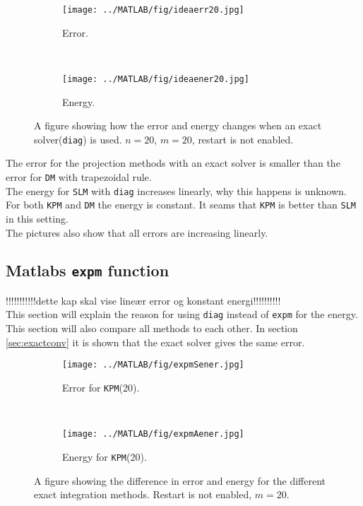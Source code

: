 \begin{figure}[H]
        \centering
        \begin{subfigure}[b]{0.45\textwidth}
                \texttt{[image: ../MATLAB/fig/ideaerr20.jpg]}
                \caption{ Error. }
                \label{fig:ideaerr20}
        \end{subfigure}%
        ~
        \begin{subfigure}[b]{0.45\textwidth}
                \texttt{[image: ../MATLAB/fig/ideaener20.jpg]}
                \caption{ Energy. }
                \label{fig:ideaener20}
        \end{subfigure}
        \caption{ A figure showing how the error and energy changes when an exact solver(\texttt{diag}) is used. $n = 20$, $m = 20$, restart is not enabled. }
        \label{fig:idea0}
\end{figure}
The error for the projection methods with an exact solver is smaller than the error for \texttt{DM} with trapezoidal rule. \\
The energy for \texttt{SLM} with \texttt{diag} increases linearly, why this happens is unknown. For both \texttt{KPM} and \texttt{DM} the energy is constant. It seams that \texttt{KPM} is better than \texttt{SLM} in this setting. \\
The pictures also show that all errors are increasing linearly.

\subsection{Matlabs \texttt{expm} function} \label{sec:resultexpm} %
!!!!!!!!!!!dette kap skal vise lineær error og konstant energi!!!!!!!!!!\\
This section will explain the reason for using \texttt{diag} instead of \texttt{expm} for the energy. This section will also compare all methods to each other. In section \ref{sec:exactconv} it is shown that the exact solver gives the same error.

\begin{figure}[H]
        \centering
		\begin{subfigure}[b]{0.45\textwidth}
                \texttt{[image: ../MATLAB/fig/expmSener.jpg]}
                \caption{ Error for \texttt{KPM}(20). }
                \label{fig:expmSerr}
        \end{subfigure}%
        ~
        \begin{subfigure}[b]{0.45\textwidth}
                \texttt{[image: ../MATLAB/fig/expmAener.jpg]}
                \caption{ Energy for \texttt{KPM}(20). }
                \label{fig:expmSener}
        \end{subfigure}
        \caption{A figure showing the difference in error and energy for the different exact integration methods. Restart is not enabled, $m = 20$. }
        \label{fig:expm}
\end{figure}

